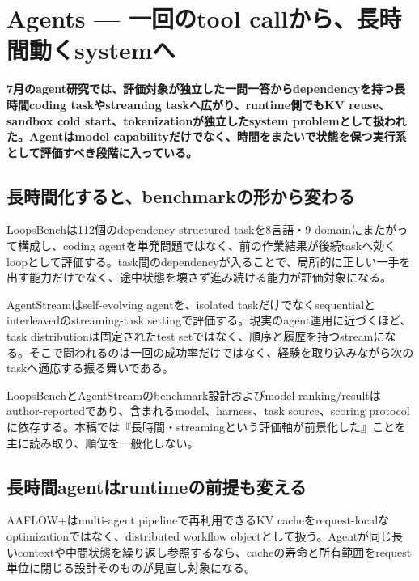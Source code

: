 \section{Agents — 一回のtool callから、長時間動くsystemへ}
\noindent\textbf{7月のagent研究では、評価対象が独立した一問一答からdependencyを持つ長時間coding taskやstreaming taskへ広がり、runtime側でもKV reuse、sandbox cold start、tokenizationが独立したsystem problemとして扱われた。Agentはmodel capabilityだけでなく、時間をまたいで状態を保つ実行系として評価すべき段階に入っている。}\autocite{src-30d9d574d4a1,src-4051106eaef3,src-4141dfcd9b12}

\subsection{長時間化すると、benchmarkの形から変わる}

LoopsBenchは112個のdependency-structured taskを8言語・9 domainにまたがって構成し、coding agentを単発問題ではなく、前の作業結果が後続taskへ効くloopとして評価する。task間のdependencyが入ることで、局所的に正しい一手を出す能力だけでなく、途中状態を壊さず進み続ける能力が評価対象になる。\autocite{src-4141dfcd9b12}


AgentStreamはself-evolving agentを、isolated taskだけでなくsequentialとinterleavedのstreaming-task settingで評価する。現実のagent運用に近づくほど、task distributionは固定されたtest setではなく、順序と履歴を持つstreamになる。そこで問われるのは一回の成功率だけではなく、経験を取り込みながら次のtaskへ適応する振る舞いである。\autocite{src-30d9d574d4a1}


\begin{claimboundary}
LoopsBenchとAgentStreamのbenchmark設計およびmodel ranking/resultはauthor-reportedであり、含まれるmodel、harness、task source、scoring protocolに依存する。本稿では『長時間・streamingという評価軸が前景化した』ことを主に読み取り、順位を一般化しない。\autocite{src-30d9d574d4a1,src-4141dfcd9b12}
\end{claimboundary}

\subsection{長時間agentはruntimeの前提も変える}

AAFLOW+はmulti-agent pipelineで再利用できるKV cacheをrequest-localなoptimizationではなく、distributed workflow objectとして扱う。Agentが同じ長いcontextや中間状態を繰り返し参照するなら、cacheの寿命と所有範囲をrequest単位に閉じる設計そのものが見直し対象になる。\autocite{src-4051106eaef3}


